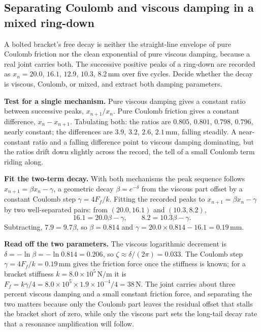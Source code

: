 \subsection{Separating Coulomb and viscous damping in a mixed ring-down}

A bolted bracket's free decay is neither the straight-line envelope of
pure Coulomb friction nor the clean exponential of pure viscous damping,
because a real joint carries both. The successive positive peaks of a
ring-down are recorded as $x_n = 20.0$, $16.1$, $12.9$, $10.3$, $8.2\,
\si{\milli\meter}$ over five cycles. Decide whether the decay is
viscous, Coulomb, or mixed, and extract both damping parameters.

\textbf{Test for a single mechanism.} Pure viscous damping gives a
constant ratio between successive peaks, $x_{n+1}/x_n$. Pure Coulomb
friction gives a constant difference, $x_n - x_{n+1}$. Tabulating both:
the ratios are $0.805$, $0.801$, $0.798$, $0.796$, nearly constant; the
differences are $3.9$, $3.2$, $2.6$, $2.1\,\si{\milli\meter}$, falling
steadily. A near-constant ratio and a falling difference point to
viscous damping dominating, but the ratios drift down slightly across
the record, the tell of a small Coulomb term riding along.

\textbf{Fit the two-term decay.} With both mechanisms the peak sequence
follows $x_{n+1} = \beta x_n - \gamma$, a geometric decay $\beta =
e^{-\delta}$ from the viscous part offset by a constant Coulomb step
$\gamma = 4F_f/k$. Fitting the recorded peaks to $x_{n+1} = \beta x_n -
\gamma$ by two well-separated pairs: from $(20.0, 16.1)$ and $(10.3,
8.2)$,
\[
16.1 = 20.0\beta - \gamma, \qquad 8.2 = 10.3\beta - \gamma.
\]
Subtracting, $7.9 = 9.7\beta$, so $\beta = 0.814$ and $\gamma = 20.0
\times 0.814 - 16.1 = 0.19\,\si{\milli\meter}$.

\textbf{Read off the two parameters.} The viscous logarithmic decrement
is $\delta = -\ln\beta = -\ln 0.814 = 0.206$, so $\zeta \approx
\delta/(2\pi) = 0.033$. The Coulomb step $\gamma = 4F_f/k = 0.19\,\si{
\milli\meter}$ gives the friction force once the stiffness is known; for
a bracket stiffness $k = 8.0\times 10^5\,\si{\newton\per\meter}$ it is
$F_f = k\gamma/4 = 8.0\times 10^5\times 1.9\times 10^{-4}/4 = 38\,\text{
N}$. The joint carries about three percent viscous damping and a small
constant friction force, and separating the two matters because only the
Coulomb part leaves the residual offset that stalls the bracket short of
zero, while only the viscous part sets the long-tail decay rate that a
resonance amplification will follow.

